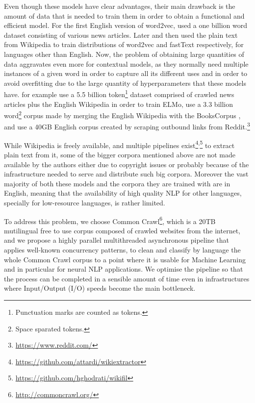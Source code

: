 Even though these models have clear advantages, their main drawback is the amount of data that is needed to train them in order to obtain a functional and efficient model. For the first English version of word2vec, \citet{mikolov-etal-2013-distributed} used a one billion word dataset consisting of various news articles. Later \citet{al-rfou-etal-2013-polyglot} and then \citet{bojanowski-etal-2017-enriching} used the plain text from Wikipedia to train distributions of word2vec and fastText respectively, for languages other than English. Now, the problem of obtaining large quantities of data aggravates even more for contextual models, as they normally need multiple instances of a given word in order to capture all its different uses and in order to avoid overfitting due to the large quantity of hyperparameters that these models have. \citet{peters-etal-2018-deep} for example use a 5.5 billion token\footnote{Punctuation marks are counted as tokens.} dataset comprised of crawled news articles plus the English Wikipedia in order to train ELMo, \citet{devlin-etal-2019-bert} use a 3.3 billion word\footnote{Space sparated tokens.} corpus made by merging the English Wikipedia with the BooksCorpus \citep{zhu-etal-2015-aligning}, and \citet{radford-etal-2019-language} use a 40GB English corpus created by scraping outbound links from Reddit.\footnote{\url{https://www.reddit.com/}}

While Wikipedia is freely available, and multiple pipelines exist\footnote{\url{https://github.com/attardi/wikiextractor}}\textsuperscript{,}\footnote{\url{https://github.com/hghodrati/wikifil}} to extract plain text from it, some of the bigger corpora mentioned above are not made available by the authors either due to copyright issues or probably because of the infrastructure needed to serve and distribute such big corpora. Moreover the vast majority of both these models and the corpora they are trained with are in English, meaning that the availability of high quality NLP for other languages, specially for low-resource languages, is rather limited.

To address this problem, we choose Common Crawl\footnote{\url{http://commoncrawl.org/}}, which is a 20TB mutilingual free to use corpus composed of crawled websites from the internet, and we propose a highly parallel multithreaded asynchronous pipeline that applies well-known concurrency patterns, to clean and classify by language the whole Common Crawl corpus to a point where it is usable for Machine Learning and in particular for neural NLP applications. We optimise the pipeline so that the process can be completed in a sensible amount of time even in infrastructures where Input/Output (I/O) speeds become the main bottleneck.

